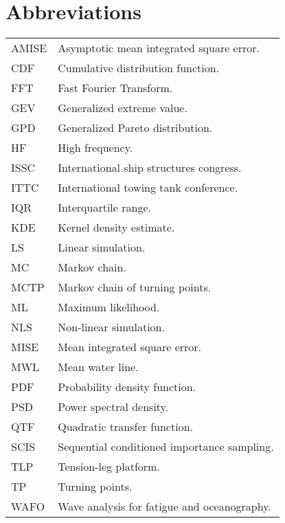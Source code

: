 \newpage
\section*{Abbreviations}

\bigskip
\begin{tabular}{p{23mm}p{125mm}}
  AMISE   & Asymptotic mean integrated square error.\\
  CDF     & Cumulative distribution function. \\
  FFT     & Fast Fourier Transform.\\
  GEV     & Generalized extreme value.\\
  GPD     & Generalized Pareto distribution.\\
  HF      & High frequency. \\
  ISSC    & International ship structures congress.\\
  ITTC    & International towing tank conference.\\
  IQR     & Interquartile range.\\
  KDE     & Kernel density estimate. \\
  LS      & Linear simulation. \\
  MC      & Markov chain.\\
  MCTP    & Markov chain of turning points.\\
  ML      & Maximum likelihood. \\
  NLS     & Non-linear simulation. \\
  MISE    & Mean integrated square error.\\
  MWL     & Mean water line.\\
  PDF     & Probability density function. \\
  PSD     & Power spectral density.\\
  QTF     & Quadratic transfer function. \\
  SCIS    & Sequential conditioned importance sampling.\\
  TLP     & Tension-leg platform. \\
  TP      & Turning points. \\
  WAFO    & Wave analysis for fatigue and oceanography.\\
\end{tabular}



